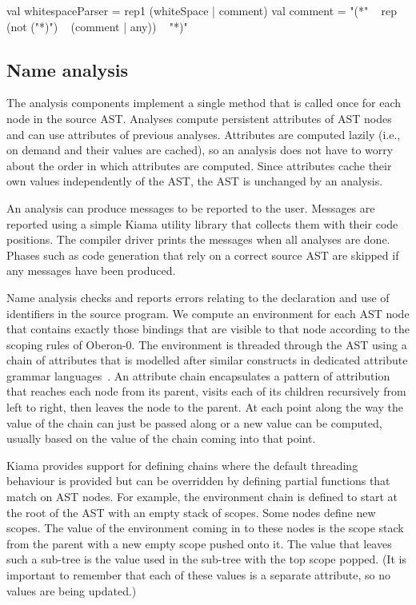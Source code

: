 \begin{scala}
  val whitespaceParser = rep1 (whiteSpace | comment)
  val comment = "(*" ~ rep (not ("*)") ~ (comment | any)) ~ "*)"
\end{scala}

\subsection{Name analysis}

The analysis components implement a single method that is called once for each node in the source AST.
Analyses compute persistent attributes of AST nodes and can use attributes of previous analyses.
Attributes are computed lazily (i.e., on demand and their values are cached), so an analysis does not have to worry about the order in which attributes are computed.
Since attributes cache their own values independently of the AST, the AST is unchanged by an analysis.

An analysis can produce messages to be reported to the user.
Messages are reported using a simple Kiama utility library that collects them with their code positions.
The compiler driver prints the messages when all analyses are done.
Phases such as code generation that rely on a correct source AST are skipped if any messages have been produced.

Name analysis checks and reports errors relating to the declaration and use of identifiers in the source program.
We compute an environment for each AST node that contains exactly those bindings that are visible to that node according to the scoping rules of Oberon-0.
The environment is threaded through the AST using a chain of attributes that is modelled after similar constructs in dedicated attribute grammar languages~\cite{Kastens94}.
An attribute chain encapsulates a pattern of attribution that reaches each node from its parent, visits each of its children recursively from left to right, then leaves the node to the parent.
At each point along the way the value of the chain can just be passed along or a new value can be computed, usually based on the value of the chain coming into that point.

Kiama provides support for defining chains where the default threading behaviour is provided but can be overridden by defining partial functions that match on AST nodes.
For example, the environment chain is defined to start at the root of the AST with an empty stack of scopes.
Some nodes define new scopes.
The value of the environment coming in to these nodes is the scope stack from the parent with a new empty scope pushed onto it.
The value that leaves such a sub-tree is the value used in the sub-tree with the top scope popped.
(It is important to remember that each of these values is a separate attribute, so no values are being updated.)

